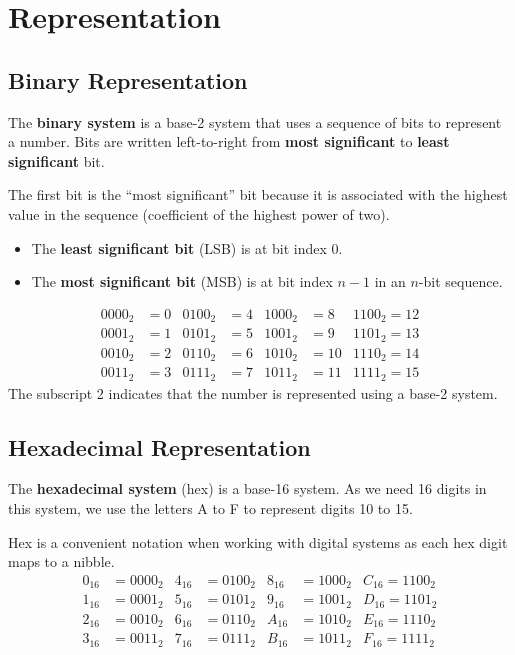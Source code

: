 \documentclass{report}
\begin{document}
\section{Representation}
\subsection{Binary Representation}
The \textbf{binary system} is a base-2 system that uses a sequence of bits to represent a number.
Bits are written left-to-right from \textbf{most significant} to \textbf{least significant} bit.

The first bit is the ``most significant'' bit because it is associated with the highest value in the sequence (coefficient of the highest power of two).
\begin{itemize}
    \item The \textbf{least significant bit} (LSB) is at bit index 0.
    \item The \textbf{most significant bit} (MSB) is at bit index \(n - 1\) in an \(n\)-bit sequence.
\end{itemize}
\begin{align*}
    0000_2 & = 0 & 0100_2 & = 4 & 1000_2 & = 8  & 1100_2 = 12 \\
    0001_2 & = 1 & 0101_2 & = 5 & 1001_2 & = 9  & 1101_2 = 13 \\
    0010_2 & = 2 & 0110_2 & = 6 & 1010_2 & = 10 & 1110_2 = 14 \\
    0011_2 & = 3 & 0111_2 & = 7 & 1011_2 & = 11 & 1111_2 = 15
\end{align*}
The subscript 2 indicates that the number is represented using a base-2 system.
\subsection{Hexadecimal Representation}
The \textbf{hexadecimal system} (hex) is a base-16 system. As we need 16 digits in this system, we use the letters A to F to represent digits 10 to 15.

Hex is a convenient notation when working with digital systems as each hex digit maps to a nibble.
\begin{align*}
    0_{16} & = 0000_2 & 4_{16} & = 0100_2 & 8_{16} & = 1000_2 & C_{16} = 1100_2 \\
    1_{16} & = 0001_2 & 5_{16} & = 0101_2 & 9_{16} & = 1001_2 & D_{16} = 1101_2 \\
    2_{16} & = 0010_2 & 6_{16} & = 0110_2 & A_{16} & = 1010_2 & E_{16} = 1110_2 \\
    3_{16} & = 0011_2 & 7_{16} & = 0111_2 & B_{16} & = 1011_2 & F_{16} = 1111_2
\end{align*}
\end{document}
